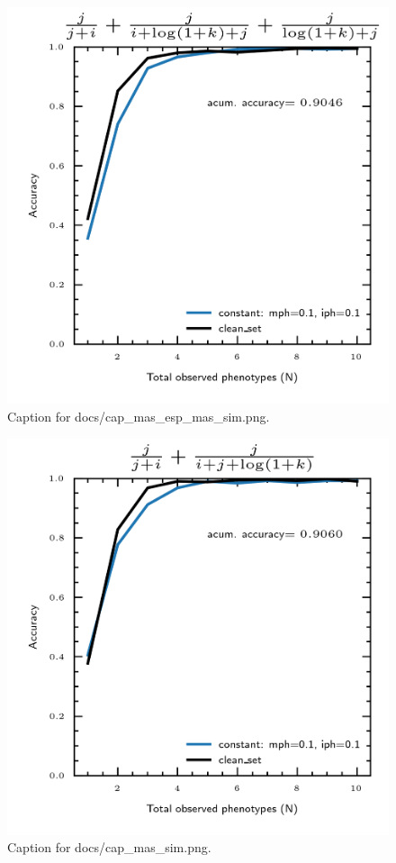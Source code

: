 \documentclass{article}
\begin{document}
\begin{figure}[h] \centering \includegraphics{docs/cap_mas_esp_mas_sim.png} \caption{Caption for docs/cap_mas_esp_mas_sim.png.} \end{figure}
\begin{figure}[h] \centering \includegraphics{docs/cap_mas_sim.png} \caption{Caption for docs/cap_mas_sim.png.} \end{figure}
\end{document}
